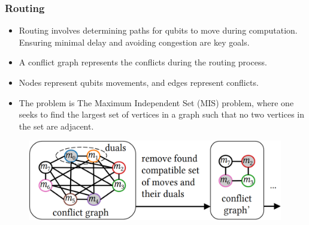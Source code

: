 \documentclass[18 pt]{beamer}
\begin{document}
\begin{frame}
    \frametitle{Routing}
    \begin{itemize}
        \item Routing involves determining paths for qubits to move during computation. Ensuring minimal delay and avoiding congestion are key goals.
        \item A conflict graph represents the conflicts during the routing process.
        \item Nodes represent qubits movements, and edges represent conflicts.
        \item The problem is The Maximum Independent Set (MIS) problem, where one seeks to find the largest set of vertices in a graph such that no two vertices in the set are adjacent.
    \end{itemize}
    \begin{figure}
        \includegraphics[height=3.5cm]{conflict.png}
    \end{figure}
\end{frame}
\end{document}
